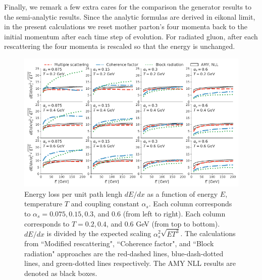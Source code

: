 \documentclass[aps, prc, reprint, amsmath, groupedaddress, nofootinbib]{revtex4-1}
\begin{document}
Finally, we remark a few extra cares for the comparison the generator results to the semi-analytic results.
Since the analytic formulas are derived in eikonal limit, in the present calculations we reset mother parton's four momenta back to the initial momentum after each time step of evolution.
For radiated gluon, after each rescattering the four momenta is rescaled so that the energy is unchanged.

\begin{figure}
\includegraphics[width=\textwidth]{Eloss_infinite.pdf}
\caption{Energy loss per unit path lengh $dE/dx$ as a function of energy $E$, temperature $T$ and coupling constant $\alpha_s$. Each column corresponds to $\alpha_s = 0.075, 0.15, 0.3$, and $0.6$ (from left to right). Each column corresponds to $T = 0.2, 0.4$, and $0.6$ GeV (from top to bottom). $dE/dx$ is divided by the expected scaling $\alpha_s^2 \sqrt{ET^3}$. The calculations from ``Modified rescattering", ``Coherence factor", and ``Block radiation" approaches are the red-dashed lines, blue-dash-dotted lines, and green-dotted lines respectively. The AMY NLL results are denoted as black boxes.}
\label{fig:eloss-inf}
\end{figure}
\end{document}
